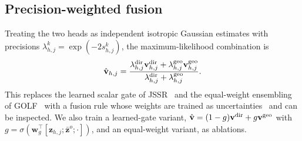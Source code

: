 \subsection{Precision-weighted fusion}
\label{sec:fusion}
Treating the two heads as independent isotropic Gaussian estimates with precisions $\lambda^{k}_{h,j}=\exp(-2s^{k}_{h,j})$, the maximum-likelihood combination is
\begin{equation}
  \hat{\mathbf{v}}_{h,j}=\frac{\lambda^{\text{dir}}_{h,j}\mathbf{v}^{\text{dir}}_{h,j}+\lambda^{\text{geo}}_{h,j}\mathbf{v}^{\text{geo}}_{h,j}}{\lambda^{\text{dir}}_{h,j}+\lambda^{\text{geo}}_{h,j}}.
  \label{eq:fusion}
\end{equation}
This replaces the learned scalar gate of JSSR~\cite{jin2026jssr} and the equal-weight ensembling of GOLF~\cite{zou2026golf} with a fusion rule whose weights are trained as uncertainties~\cite{nix1994estimating,kendall2017uncertainties} and can be inspected. We also train a learned-gate variant, $\hat{\mathbf{v}}=(1-g)\mathbf{v}^{\text{dir}}+g\mathbf{v}^{\text{geo}}$ with $g=\sigma(\mathbf{w}_g^\top[\mathbf{z}_{h,j};\bar{\mathbf{z}}^o;\cdot])$, and an equal-weight variant, as ablations.


